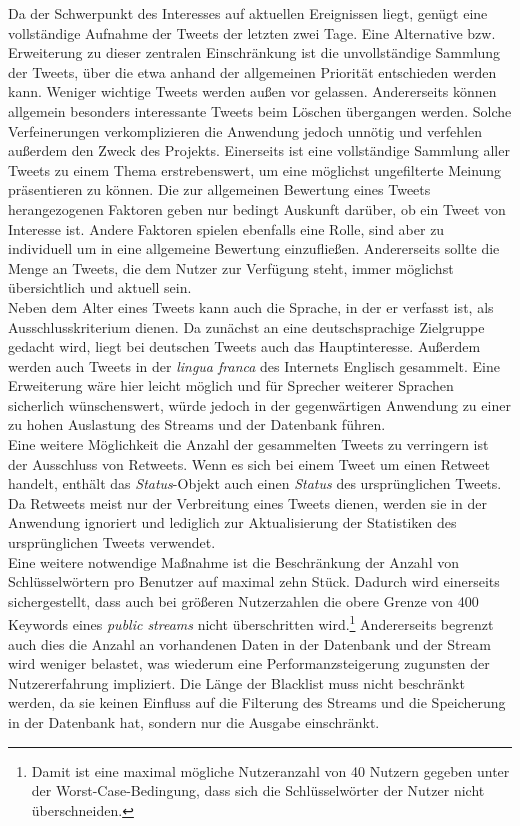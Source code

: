 Da der Schwerpunkt des Interesses auf aktuellen Ereignissen liegt, genügt eine vollständige Aufnahme der Tweets der letzten zwei Tage. Eine Alternative bzw. Erweiterung zu dieser zentralen Einschränkung ist die unvollständige Sammlung der Tweets, über die etwa anhand der allgemeinen Priorität entschieden werden kann. Weniger wichtige Tweets werden außen vor gelassen. Andererseits können allgemein besonders interessante Tweets beim Löschen übergangen werden. Solche Verfeinerungen verkomplizieren die Anwendung jedoch unnötig und verfehlen außerdem den Zweck des Projekts. Einerseits ist eine vollständige Sammlung aller Tweets zu einem Thema erstrebenswert, um eine möglichst ungefilterte Meinung präsentieren zu können. Die zur allgemeinen Bewertung eines Tweets herangezogenen Faktoren geben nur bedingt Auskunft  darüber, ob ein Tweet von Interesse ist. Andere Faktoren spielen ebenfalls eine Rolle, sind aber zu individuell um in eine allgemeine Bewertung einzufließen. Andererseits sollte die Menge an Tweets, die dem Nutzer zur Verfügung steht, immer möglichst übersichtlich und aktuell sein. \\
Neben dem Alter eines Tweets kann auch die Sprache, in der er verfasst ist, als Ausschlusskriterium dienen. Da zunächst an eine deutschsprachige Zielgruppe gedacht wird, liegt bei deutschen Tweets auch das Hauptinteresse. Außerdem werden auch Tweets in der \textit{lingua franca} des Internets Englisch gesammelt. Eine Erweiterung wäre hier leicht möglich und für Sprecher weiterer Sprachen sicherlich wünschenswert, würde jedoch in der gegenwärtigen Anwendung zu einer zu hohen Auslastung des Streams und der Datenbank führen. \\
Eine weitere Möglichkeit die Anzahl der gesammelten Tweets zu verringern ist der Ausschluss von Retweets. Wenn es sich bei einem Tweet um einen Retweet handelt, enthält das \textit{Status}-Objekt auch einen \textit{Status} des ursprünglichen Tweets. Da Retweets meist nur der Verbreitung eines Tweets dienen, werden sie in der Anwendung ignoriert und lediglich zur Aktualisierung der Statistiken des ursprünglichen Tweets verwendet. \\
Eine weitere notwendige Maßnahme ist die Beschränkung der Anzahl von Schlüsselwörtern pro Benutzer auf maximal zehn Stück. Dadurch wird einerseits sichergestellt, dass auch bei größeren Nutzerzahlen die obere Grenze von 400 Keywords eines \textit{public streams} nicht überschritten wird.\footnote{Damit ist eine maximal mögliche Nutzeranzahl von 40 Nutzern gegeben unter der Worst-Case-Bedingung, dass sich die Schlüsselwörter der Nutzer nicht überschneiden.} Andererseits begrenzt auch dies die Anzahl an vorhandenen Daten in der Datenbank und der Stream wird weniger belastet, was wiederum eine Performanzsteigerung zugunsten der Nutzererfahrung impliziert. Die Länge der Blacklist muss nicht beschränkt werden, da sie keinen Einfluss auf die Filterung des Streams und die Speicherung in der Datenbank hat, sondern nur die Ausgabe einschränkt. \\
